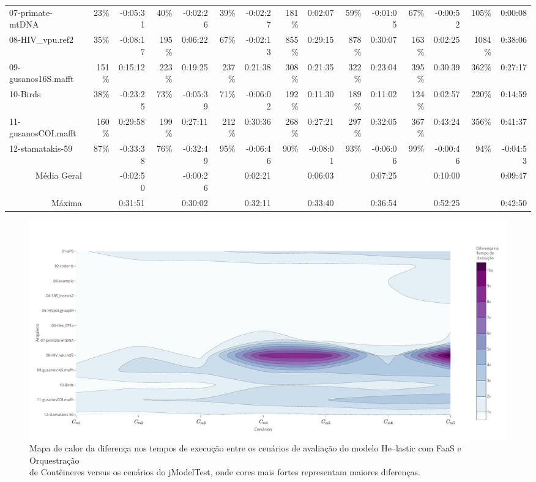 \documentclass[english,brazilian]{UNISINOSmonografia} %
\begin{document}
{\begin{landscape}
\begin{table}
\begin{minipage}{1.1\linewidth}
\begin{tabularx}{\linewidth}{@{\extracolsep{\fill}}lrrrrrrrrrrrrrr@{}}
			07-primate-mtDNA & 23\% & -0:05:31 & 40\% & -0:02:26 & 39\% & -0:02:27 & 181\% & 0:02:07 & 59\% & -0:01:05 & 67\% & -0:00:52 & 105\% & 0:00:08 \\
			08-HIV\_vpu.ref2 & 35\% & -0:08:17 & 195\% & 0:06:22 & 67\% & -0:02:13 & 855\% & 0:29:15 & 878\% & 0:30:07 & 163\% & 0:02:25 & 1084\% & 0:38:06 \\
			09-gusanos16S.mafft & 151\% & 0:15:12 & 223\% & 0:19:25 & 237\% & 0:21:38 & 308\% & 0:21:35 & 322\% & 0:23:04 & 395\% & 0:30:39 & 362\% & 0:27:17 \\
			10-Birds & 38\% & -0:23:25 & 73\% & -0:05:39 & 71\% & -0:06:02 & 192\% & 0:11:30 & 189\% & 0:11:02 & 124\% & 0:02:57 & 220\% & 0:14:59 \\
			11-gusanosCOI.mafft & 160\% & 0:29:58 & 199\% & 0:27:11 & 212\% & 0:30:36 & 268\% & 0:27:21 & 297\% & 0:32:05 & 367\% & 0:43:24 & 356\% & 0:41:37 \\
			12-stamatakis-59 & 87\% & -0:33:38 & 76\% & -0:32:49 & 95\% & -0:06:46 & 90\% & -0:08:01 & 93\% & -0:06:06 & 99\% & -0:00:46 & 94\% & -0:04:53 \\ 
			\bottomrule
			\multicolumn{1}{r}{Média Geral} &  & \textcolor{success-green}{-0:02:50} &  & -0:00:26 &  & 0:02:21 &  & 0:06:03 &  & 0:07:25 &  & \textcolor{failure-red}{0:10:00} &  & 0:09:47 \\
			\multicolumn{1}{r}{Máxima} &  & 0:31:51 &  & \textcolor{success-green}{0:30:02} &  & 0:32:11 &  & 0:33:40 &  & 0:36:54 &  & \textcolor{failure-red}{0:52:25} &  & 0:42:50
		\end{tabularx}
	\end{minipage}
\end{table}


\begin{figure}[p]
	\centering%
	\begin{minipage}{1.13\linewidth}
		\caption{Mapa de calor da diferença nos tempos de execução entre os cenários de avaliação do modelo \textsf{He}--lastic com FaaS e Orquestração\\ de Contêineres versus os cenários do jModelTest, onde cores mais fortes representam maiores diferenças.}
		\label{fig:results-modelo-mixed}
		\includegraphics[trim=0 20 0 60,clip,width=\textwidth]{results-modelo-mixed}
	\end{minipage}
\end{figure}


\end{landscape}
}
\end{document}
